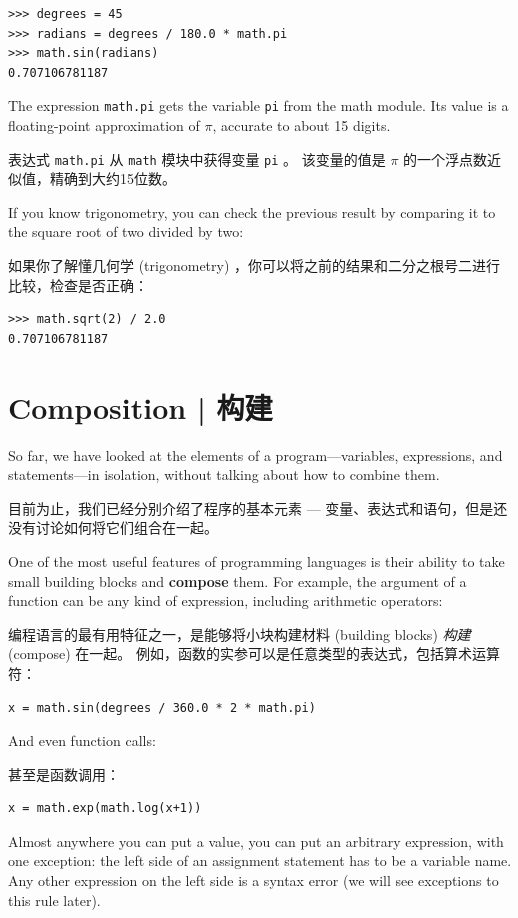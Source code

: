 \begin{lstlisting}
>>> degrees = 45
>>> radians = degrees / 180.0 * math.pi
>>> math.sin(radians)
0.707106781187
\end{lstlisting}
%
The expression {\tt math.pi} gets the variable {\tt pi} from the math
module.  Its value is a floating-point approximation
of $\pi$, accurate to about 15 digits.

表达式 \lstinline{math.pi} 从 \lstinline{math} 模块中获得变量 \lstinline{pi} 。
该变量的值是 $\pi$ 的一个浮点数近似值，精确到大约15位数。
  \index{$\pi$}

If you know
trigonometry, you can check the previous result by comparing it to
the square root of two divided by two:

如果你了解懂几何学 (trigonometry) ，你可以将之前的结果和二分之根号二进行比较，检查是否正确：
  

\begin{lstlisting}
>>> math.sqrt(2) / 2.0
0.707106781187
\end{lstlisting}
%

%
\section{Composition  |  构建}

So far, we have looked at the elements of a program---variables,
expressions, and statements---in isolation, without talking about how to
combine them.

目前为止，我们已经分别介绍了程序的基本元素 --- 变量、表达式和语句，但是还没有讨论如何将它们组合在一起。

One of the most useful features of programming languages is their
ability to take small building blocks and {\bf compose} them.  For
example, the argument of a function can be any kind of expression,
including arithmetic operators:

编程语言的最有用特征之一，是能够将小块构建材料 (building blocks) \emph{构建} (compose) 在一起。
例如，函数的实参可以是任意类型的表达式，包括算术运算符：

\begin{lstlisting}
x = math.sin(degrees / 360.0 * 2 * math.pi)
\end{lstlisting}
%
And even function calls:

甚至是函数调用：

\begin{lstlisting}
x = math.exp(math.log(x+1))
\end{lstlisting}
%
Almost anywhere you can put a value, you can put an arbitrary
expression, with one exception: the left side of an assignment
statement has to be a variable name.  Any other expression on the left
side is a syntax error (we will see exceptions to this rule
later).

